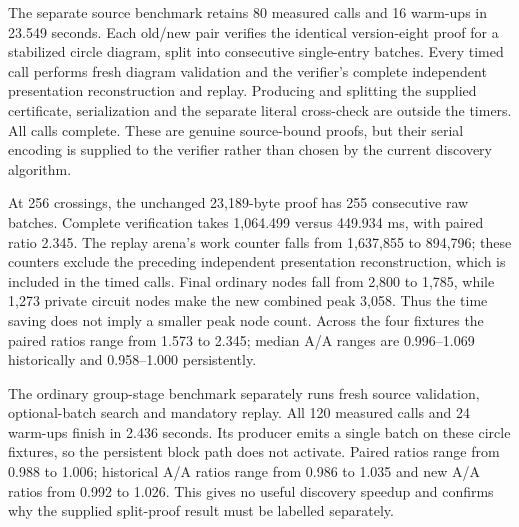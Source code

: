 The separate source benchmark retains 80 measured calls and 16 warm-ups in
23.549 seconds. Each old/new pair verifies the identical version-eight proof
for a stabilized circle diagram, split into consecutive single-entry batches.
Every timed call performs fresh diagram validation and the verifier's complete
independent presentation reconstruction and replay. Producing and splitting
the supplied certificate, serialization and the separate literal cross-check
are outside the timers. All calls complete. These are genuine source-bound
proofs, but their serial encoding is supplied to the verifier rather than
chosen by the current discovery algorithm.



At 256 crossings, the unchanged 23,189-byte proof has 255 consecutive raw
batches. Complete verification takes 1,064.499 versus 449.934 ms, with paired
ratio 2.345. The replay arena's work counter falls from 1,637,855 to 894,796;
these counters exclude the preceding independent presentation reconstruction,
which is included in the timed calls. Final ordinary nodes fall from 2,800
to 1,785, while 1,273 private circuit nodes make the new combined peak 3,058.
Thus the time saving does not imply a smaller peak node count. Across the
four fixtures the paired ratios range from 1.573 to 2.345; median A/A ranges
are 0.996--1.069 historically and 0.958--1.000 persistently.

The ordinary group-stage benchmark separately runs fresh source validation,
optional-batch search and mandatory replay. All 120 measured calls and 24
warm-ups finish in 2.436 seconds. Its producer emits a single batch on these
circle fixtures, so the persistent block path does not activate. Paired
ratios range from 0.988 to 1.006; historical A/A ratios range from 0.986 to
1.035 and new A/A ratios from 0.992 to 1.026. This gives no useful discovery
speedup and confirms why the supplied split-proof result must be labelled
separately.



